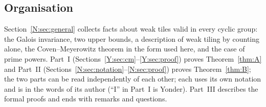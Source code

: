 \documentclass[11pt,a4paper]{amsart}
\theoremstyle{definition}
\theoremstyle{remark}
\begin{document}
\subsection*{Organisation} Section~\ref{N:sec:general} collects facts about weak tiles valid in every cyclic
group: the Galois invariance, two upper bounds, a description of weak tiling by counting alone, the
Coven--Meyerowitz theorem in the form used here, and the case of prime powers. Part~I
(Sections~\ref{Y:sec:cm}--\ref{Y:sec:proof}) proves Theorem~\ref{thm:A} and Part~II
(Sections~\ref{N:sec:notation}--\ref{N:sec:proof}) proves Theorem~\ref{thm:B}; the two parts can be read
independently of each other; each uses its own notation and is in the words of its author (``I'' in Part~I
is Yonder). Part~III describes the formal proofs and ends with
remarks and questions.
\end{document}
